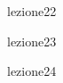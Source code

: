 \documentclass[12pt,a4paper,headings=optiontohead]{scrbook}
\begin{document}
\newpage
{lezione22}


\newpage
{lezione23}


\newpage
{lezione24}


\newpage
\end{document}
